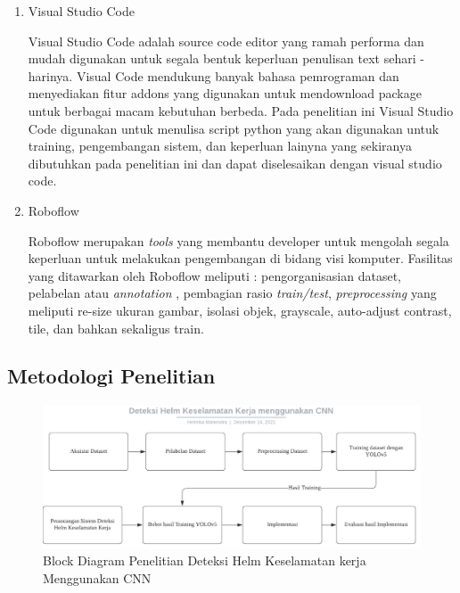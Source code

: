 \begin{enumerate}
\begin{enumerate}
    \item Visual Studio Code
    \par Visual Studio Code adalah source code editor yang ramah performa dan mudah digunakan untuk segala bentuk keperluan penulisan text sehari - harinya. Visual Code mendukung banyak bahasa pemrograman dan menyediakan fitur addons yang digunakan untuk mendownload package untuk berbagai macam kebutuhan berbeda. Pada penelitian ini Visual Studio Code digunakan untuk menulisa script python yang akan digunakan untuk training, pengembangan sistem, dan keperluan lainyna yang sekiranya dibutuhkan pada penelitian ini dan dapat diselesaikan dengan visual studio code.\cite{microsoft_2021}

    \item Roboflow
    \par Roboflow merupakan \emph{tools} yang membantu developer untuk mengolah segala keperluan untuk melakukan pengembangan di bidang visi komputer. Fasilitas yang ditawarkan oleh Roboflow meliputi : pengorganisasian dataset, 
    pelabelan atau \emph{annotation} , pembagian rasio \emph{train/test}, \emph{preprocessing} yang meliputi re-size ukuran gambar, isolasi objek, grayscale, auto-adjust contrast, tile, dan bahkan sekaligus train. 

  \end{enumerate}


\end{enumerate}



\subsection{Metodologi Penelitian}
\label{metodologipenelitian}

\begin{figure}[ht]
  \centering
  \includegraphics[scale=0.7]{gambar/Metodologi CNN.png}
  \caption{Block Diagram Penelitian Deteksi Helm Keselamatan kerja Menggunakan CNN}
  \label{fig:blockdiagramhelmetdetection}  
\end{figure}

